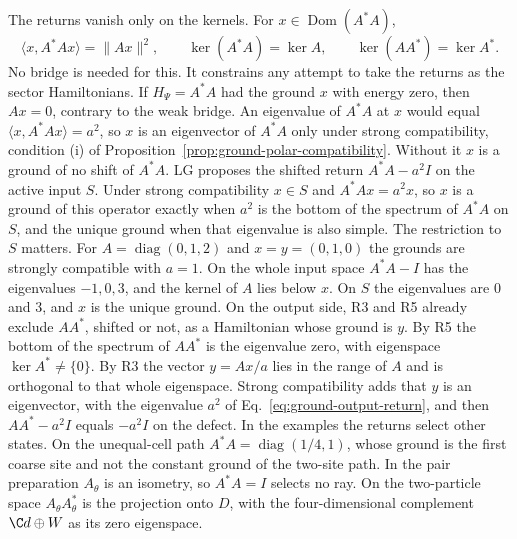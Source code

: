The returns vanish only on the kernels. For $x\in\operatorname{Dom}(A^*A)$,
\begin{equation}
 \langle x,A^*Ax\rangle=\|Ax\|^2,\qquad
 \ker(A^*A)=\ker A,\qquad \ker(AA^*)=\ker A^* .
 \label{eq:return-kernels}
\end{equation}
No bridge is needed for this. It constrains any attempt to take the returns as the sector Hamiltonians. If $H_\Psi=A^*A$ had the ground $x$ with energy zero, then $Ax=0$, contrary to the weak bridge. An eigenvalue of $A^*A$ at $x$ would equal $\langle x,A^*Ax\rangle=a^2$, so $x$ is an eigenvector of $A^*A$ only under strong compatibility, condition (i) of Proposition~\ref{prop:ground-polar-compatibility}. Without it $x$ is a ground of no shift of $A^*A$. LG proposes the shifted return $A^*A-a^2I$ on the active input $S$. Under strong compatibility $x\in S$ and $A^*Ax=a^2x$, so $x$ is a ground of this operator exactly when $a^2$ is the bottom of the spectrum of $A^*A$ on $S$, and the unique ground when that eigenvalue is also simple. The restriction to $S$ matters. For $A=\operatorname{diag}(0,1,2)$ and $x=y=(0,1,0)$ the grounds are strongly compatible with $a=1$. On the whole input space $A^*A-I$ has the eigenvalues $-1,0,3$, and the kernel of $A$ lies below $x$. On $S$ the eigenvalues are $0$ and $3$, and $x$ is the unique ground. On the output side, R3 and R5 already exclude $AA^*$, shifted or not, as a Hamiltonian whose ground is $y$. By R5 the bottom of the spectrum of $AA^*$ is the eigenvalue zero, with eigenspace $\ker A^*\ne\{0\}$. By R3 the vector $y=Ax/a$ lies in the range of $A$ and is orthogonal to that whole eigenspace. Strong compatibility adds that $y$ is an eigenvector, with the eigenvalue $a^2$ of Eq.~\eqref{eq:ground-output-return}, and then $AA^*-a^2I$ equals $-a^2I$ on the defect. In the examples the returns select other states. On the unequal-cell path $A^*A=\operatorname{diag}(1/4,1)$, whose ground is the first coarse site and not the constant ground of the two-site path. In the pair preparation $A_\theta$ is an isometry, so $A^*A=I$ selects no ray. On the two-particle space $A_\theta A_\theta^*$ is the projection onto $D$, with the four-dimensional complement $\C d\oplus W$ as its zero eigenspace.
